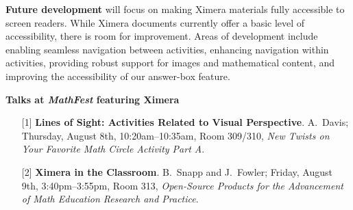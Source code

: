 \documentclass[twocolumn]{article}
\begin{document}
\vspace{-.2cm}  

\begin{xframe}
    {\sffamily\bfseries Future development} will focus on making Ximera
    materials fully accessible to screen readers. While Ximera documents
    currently
    offer a basic level of accessibility, there is room for
    improvement. Areas of development include enabling seamless navigation
    between activities, enhancing navigation within activities, providing
    robust
    support for images and mathematical content, and improving the
    accessibility of
    our answer-box feature.
\end{xframe}

\restoregeometry

\begin{xframe}
    {\sffamily\bfseries Talks at \textsl{MathFest} featuring Ximera}
    \begin{itemize}
        \item[{[1]}] \textbf{Lines of Sight: Activities Related to Visual
            Perspective}. A.\ Davis; Thursday, August 8th,
        10:20am--10:35am,
        Room 309/310,
        \textit{New Twists on Your Favorite Math Circle Activity Part A}.
        \item[{[2]}] \textbf{Ximera in the Classroom}. B.\ Snapp and J.\
        Fowler;
        Friday, August 9th, 3:40pm--3:55pm, Room 313, \textit{Open-Source
            Products for
            the Advancement of Math Education Research and Practice}.
    \end{itemize}
\end{xframe}

\vspace{-.2cm}
\end{document}
